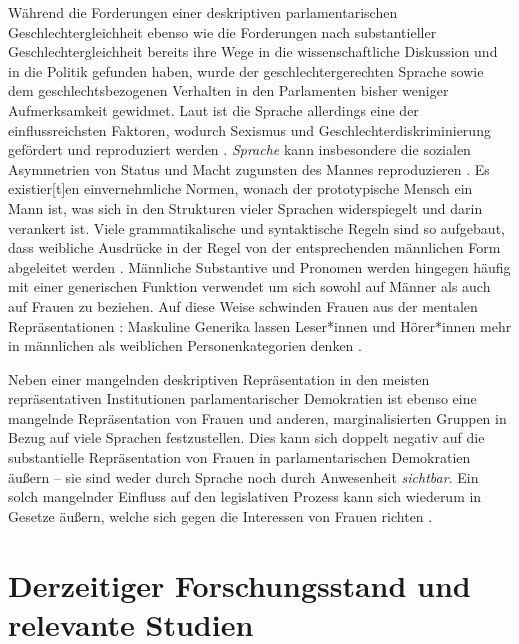\documentclass[12pt, 
    twoside=false, 
    bibliography=totoc, 
    numbers=endperiod, 
    headings=normal, 
    toc=chapterentrydotfill
    ]{scrbook}
\begin{document}
Während die Forderungen einer deskriptiven parlamentarischen Geschlechtergleichheit ebenso wie die Forderungen nach substantieller Geschlechtergleichheit bereits ihre Wege in die wissenschaftliche Diskussion und in die Politik gefunden haben, wurde der geschlechtergerechten Sprache sowie dem geschlechtsbezogenen Verhalten in den Parlamenten bisher weniger Aufmerksamkeit gewidmet. 
Laut \textcite{menegatti_2017} ist die Sprache allerdings eine der einflussreichsten Faktoren, wodurch Sexismus und Geschlechterdiskriminierung gefördert und reproduziert werden \parencite*[1]{menegatti_2017}. \emph{Sprache} kann insbesondere die sozialen Asymmetrien von Status und Macht zugunsten des Mannes reproduzieren \parencite[1]{menegatti_2017}. Es existier[t]en einvernehmliche Normen, wonach der prototypische Mensch ein Mann ist, was sich in den Strukturen vieler Sprachen widerspiegelt und darin verankert ist. Viele grammatikalische und syntaktische Regeln sind so aufgebaut, dass weibliche Ausdrücke in der Regel von der entsprechenden männlichen Form abgeleitet werden \parencite*[1]{menegatti_2017}. Männliche Substantive und Pronomen werden hingegen häufig mit einer generischen Funktion verwendet um sich sowohl auf Männer als auch auf Frauen zu beziehen. Auf diese Weise schwinden Frauen aus der mentalen Repräsentationen \parencites{vaughan_2018}{stahlberg_2001}: Maskuline Generika lassen Leser*innen und Hörer*innen mehr in männlichen als weiblichen Personenkategorien denken \parencites[2]{sczesny_2016}{stahlberg_2007}.

Neben einer mangelnden deskriptiven Repräsentation in den meisten repräsentativen Institutionen parlamentarischer Demokratien \parencite[vgl.][]{ipu_2019} ist ebenso eine mangelnde Repräsentation von Frauen und anderen, marginalisierten Gruppen in Bezug auf viele Sprachen festzustellen. Dies kann sich doppelt negativ auf die substantielle Repräsentation von Frauen in parlamentarischen Demokratien äußern -- sie sind weder durch Sprache noch durch Anwesenheit \emph{sichtbar}. Ein solch mangelnder Einfluss auf den legislativen Prozess kann sich wiederum in Gesetze äußern, welche sich gegen die Interessen von Frauen richten \parencite[2]{back_2018}.


\section {Derzeitiger Forschungsstand und relevante Studien}

\end{document}
